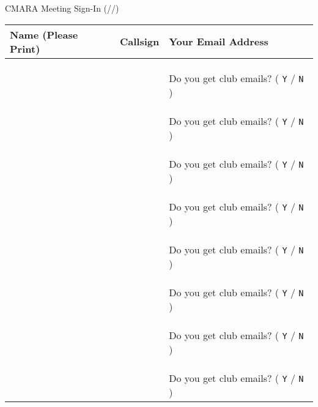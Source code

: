 \documentclass[10pt,letterpaper]{article}
\begin{document}
\begin{center}

{\Large CMARA Meeting Sign-In (\hspace{1cm}/\hspace{1cm}/\hspace{1cm})}
\medskip

\noindent
\begin{tabular}{|p{5cm}|p{3cm}|p{6cm}|}
  \hline
  Name (Please Print) & Callsign & Your Email Address \\ \hline

  && \\ && \\ && \\ && \small{Do you get club emails? ( {\large\texttt{Y}} / {\large\texttt{N}} )} \\ \hline
  && \\ && \\ && \\ && \small{Do you get club emails? ( {\large\texttt{Y}} / {\large\texttt{N}} )} \\ \hline
  && \\ && \\ && \\ && \small{Do you get club emails? ( {\large\texttt{Y}} / {\large\texttt{N}} )} \\ \hline
  && \\ && \\ && \\ && \small{Do you get club emails? ( {\large\texttt{Y}} / {\large\texttt{N}} )} \\ \hline
  && \\ && \\ && \\ && \small{Do you get club emails? ( {\large\texttt{Y}} / {\large\texttt{N}} )} \\ \hline
  && \\ && \\ && \\ && \small{Do you get club emails? ( {\large\texttt{Y}} / {\large\texttt{N}} )} \\ \hline
  && \\ && \\ && \\ && \small{Do you get club emails? ( {\large\texttt{Y}} / {\large\texttt{N}} )} \\ \hline
  && \\ && \\ && \\ && \small{Do you get club emails? ( {\large\texttt{Y}} / {\large\texttt{N}} )} \\ \hline

\end{tabular}
\end{center}
\end{document}
